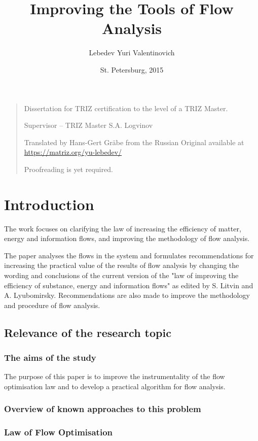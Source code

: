 \documentclass[a4paper,11pt]{article}
\author{Lebedev Yuri Valentinovich}
\title{Improving the Tools of Flow Analysis}
\date{St. Petersburg, 2015}
\begin{document}
\maketitle

\begin{quote}
  Dissertation for TRIZ certification to the level of a TRIZ Master.

  Supervisor -- TRIZ Master S.A. Logvinov

  Translated by Hans-Gert Gräbe from the Russian Original available at
  \url{https://matriz.org/yu-lebedev/}

  Proofreading is yet required.
\end{quote}

\section{Introduction}

The work focuses on clarifying the law of increasing the efficiency of matter,
energy and information flows, and improving the methodology of flow analysis.

The paper analyses the flows in the system and formulates recommendations for
increasing the practical value of the results of flow analysis by changing the
wording and conclusions of the current version of the "law of improving the
efficiency of substance, energy and information flows" as edited by S. Litvin
and A. Lyubomirsky. Recommendations are also made to improve the methodology
and procedure of flow analysis.

\subsection{Relevance of the research topic}

\subsubsection{The aims of the study}

The purpose of this paper is to improve the instrumentality of the flow
optimisation law and to develop a practical algorithm for flow analysis.

\subsubsection{Overview of known approaches to this problem}

\subsubsection*{Law of Flow Optimisation} 
\end{document}
